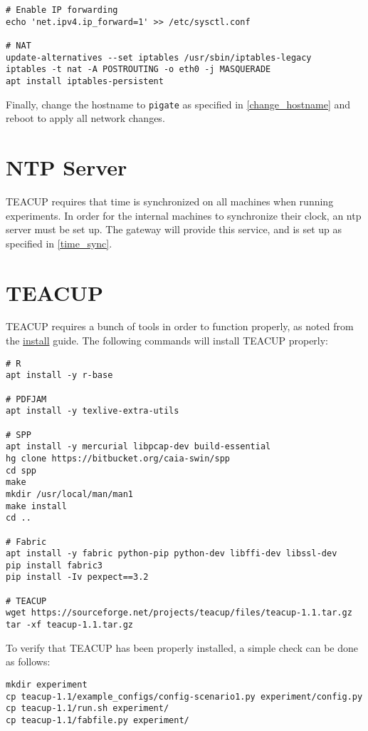 \begin{lstlisting}
# Enable IP forwarding
echo 'net.ipv4.ip_forward=1' >> /etc/sysctl.conf

# NAT
update-alternatives --set iptables /usr/sbin/iptables-legacy
iptables -t nat -A POSTROUTING -o eth0 -j MASQUERADE
apt install iptables-persistent
\end{lstlisting}

Finally, change the hostname to \lstinline{pigate} as specified in \ref{change_hostname} and reboot to apply all network changes.



\section{NTP Server}

TEACUP requires that time is synchronized on all machines when running experiments. In order for the internal machines to synchronize their clock, an \gls{ntp} server must be set up. The gateway will provide this service, and is set up as specified in \ref{time_sync}.


\section{TEACUP}

TEACUP requires a bunch of tools in order to function properly, as noted from the \href{http://caia.swin.edu.au/tools/teacup/TEACUP-0.9_INSTALL.txt}{install} guide. The following commands will install TEACUP properly:

\begin{lstlisting}
# R
apt install -y r-base

# PDFJAM
apt install -y texlive-extra-utils

# SPP
apt install -y mercurial libpcap-dev build-essential
hg clone https://bitbucket.org/caia-swin/spp
cd spp
make
mkdir /usr/local/man/man1
make install
cd ..

# Fabric
apt install -y fabric python-pip python-dev libffi-dev libssl-dev
pip install fabric3
pip install -Iv pexpect==3.2

# TEACUP
wget https://sourceforge.net/projects/teacup/files/teacup-1.1.tar.gz
tar -xf teacup-1.1.tar.gz
\end{lstlisting}

To verify that TEACUP has been properly installed, a simple check can be done as follows:

\begin{lstlisting}
mkdir experiment
cp teacup-1.1/example_configs/config-scenario1.py experiment/config.py
cp teacup-1.1/run.sh experiment/
cp teacup-1.1/fabfile.py experiment/
\end{lstlisting}

